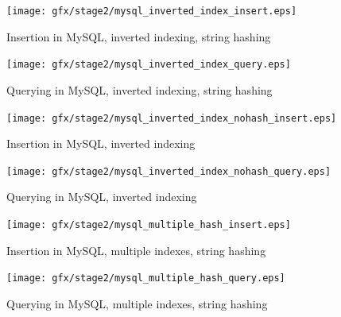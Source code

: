 \begin{figure} 
    \centering
    \texttt{[image: gfx/stage2/mysql\_inverted\_index\_insert.eps]}
    \caption{Insertion in MySQL, inverted indexing, string hashing}
    \label{fig:mysql_iii}
\end{figure}
\begin{figure} 
    \centering
    \texttt{[image: gfx/stage2/mysql\_inverted\_index\_query.eps]}
    \caption{Querying in MySQL, inverted indexing, string hashing}
    \label{fig:mysql_iiq}
\end{figure}
\clearpage

\begin{figure} 
    \centering
    \texttt{[image: gfx/stage2/mysql\_inverted\_index\_nohash\_insert.eps]}
    \caption{Insertion in MySQL, inverted indexing}
    \label{fig:mysql_iini}
\end{figure}
\begin{figure} 
    \centering
    \texttt{[image: gfx/stage2/mysql\_inverted\_index\_nohash\_query.eps]}
    \caption{Querying in MySQL, inverted indexing}
    \label{fig:mysql_iinq}
\end{figure}
\clearpage

\begin{figure} 
    \centering
    \texttt{[image: gfx/stage2/mysql\_multiple\_hash\_insert.eps]}
    \caption{Insertion in MySQL, multiple indexes, string hashing}
    \label{fig:mysql_mhi}
\end{figure}
\begin{figure}
    \centering
    \texttt{[image: gfx/stage2/mysql\_multiple\_hash\_query.eps]}
    \caption{Querying in MySQL, multiple indexes, string hashing}
    \label{fig:mysql_mhq}
\end{figure}
\clearpage

